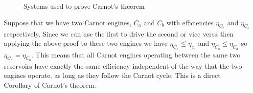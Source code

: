 \documentclass[a4paper]{article}
\begin{document}
\begin{figure}[ht]
        \caption{Systems used to prove Carnot's theorem}
    \end{figure}
    
    Suppose that we have two Carnot engines, \(C_a\) and \(C_b\) with efficiencies \(\eta_{C_a}\) and \(\eta_{C_b}\) respectively.
    Since we can use the first to drive the second or vice versa then applying the above proof to these two engines we have \(\eta_{C_a}\le \eta_{c_b}\) and \(\eta_{C_b}\le\eta_{C_a}\) so \(\eta_{C_a} = \eta_{C_b}\).
    This means that all Carnot engines operating between the same two reservoirs have exactly the same efficiency independent of the way that the two engines operate, as long as they follow the Carnot cycle.
    This is a direct Corollary of Carnot's theorem.
    
\end{document}
